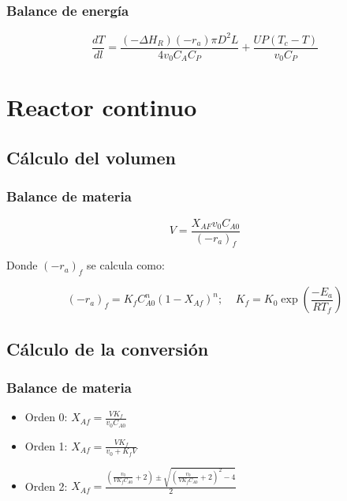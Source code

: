 \documentclass[20pt,a4paper]{extarticle}
\begin{document}
		\subsubsection{Balance de energía}
		\begin{equation*}
		\frac{dT}{dl} = \frac{(-\Delta H_R)(-r_a)\pi D^2 L}{4v_0C_AC_P} + \frac{UP(T_c-T)}{v_0C_P}
		\end{equation*}
		
		
\section{Reactor continuo}
	\subsection{Cálculo del volumen}
		\subsubsection{Balance de materia}
			\begin{equation*}
				V= \frac{X_{AF}v_0C_{A0}}{(-r_a)_f}
			\end{equation*}
			
			Donde $(-r_a)_f$ se calcula como:
			
			\begin{equation*}
				(-r_a)_f = K_fC_{A0}^n (1-X_{Af})^n; ~~~~~ K_f = K_0 \exp \left(\frac{-E_a}{RT_f}\right)
			\end{equation*}
	
	\subsection{Cálculo de la conversión}
		\subsubsection{Balance de materia}
			\begin{itemize}
				\item Orden 0: $X_{Af} = \frac{VK_f}{v_0C_{A0}}$
				\item Orden 1: $X_{Af} = \frac{VK_f}{v_0+K_fV}$
				\item Orden 2: $X_{Af} = \frac{\left(\frac{v_0}{VK_fC_{A0}}+2\right)\pm \sqrt{\left(\frac{v_0}{VK_fC_{A0}}+2\right)^2-4}}{2}$
			\end{itemize}
\end{document}
